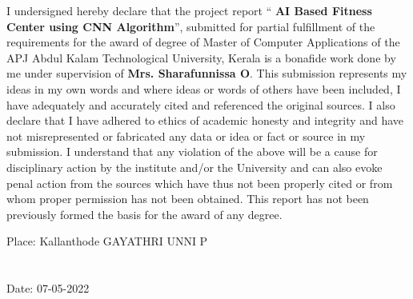 \documentclass[a4paper,12pt,toc=flat]{report}
\begin{document}
	\vspace*{20pt}
	{\normalsize I undersigned hereby declare that the project report “{\bfseries 
			AI Based Fitness Center using CNN Algorithm}”, submitted for partial fulfillment of the requirements for the award of degree of Master of Computer Applications of the APJ Abdul Kalam Technological University, Kerala is a bonafide
		work done by me under supervision of {\bf Mrs. Sharafunnissa O}. This submission represents my ideas in my
		own words and where ideas or words of others have been included, I have adequately and accurately
		cited and referenced the original sources. I also declare that I have adhered to ethics of academic
		honesty and integrity and have not misrepresented or fabricated any data or idea or fact or source
		in my submission. I understand that any violation of the above will be a cause for disciplinary action
		by the institute and/or the University and can also evoke penal action from the sources which have
		thus not been properly cited or from whom proper permission has not been obtained. This report
		has not been previously formed the basis for the award of any degree. } \\
	
	
	\vspace{20pt}
	\begin{center}
		Place: Kallanthode \hspace*{14.5pt} \hfill  GAYATHRI UNNI P  \\ \hfill\\ \hfill  \\
		\vspace*{10pt}
		Date: 07-05-2022 \hspace*{0pt} \hfill 
		\vspace{10pt}
		
		
		
	\end{center}
	
\end{document}

